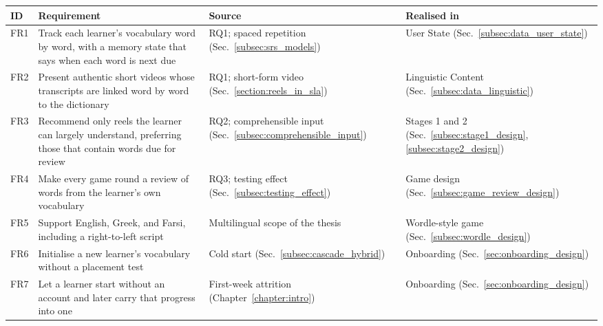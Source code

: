     \begin{center}
        \begin{minipage}{\linewidth}%
        \small
        \label{tab:functional_requirements}
        \begin{tabular}{L{0.9cm}L{5.2cm}L{3.5cm}L{3.5cm}}
            \hline
            \textbf{ID} & \textbf{Requirement} & \textbf{Source} & \textbf{Realised in} \\
            \hline
            FR1 & Track each learner's vocabulary word by word, with a memory state that says when each word is next due & RQ1; spaced repetition (Sec.~\ref{subsec:srs_models}) & User State (Sec.~\ref{subsec:data_user_state}) \\
            \hline
            FR2 & Present authentic short videos whose transcripts are linked word by word to the dictionary & RQ1; short-form video (Sec.~\ref{section:reels_in_sla}) & Linguistic Content (Sec.~\ref{subsec:data_linguistic}) \\
            \hline
            FR3 & Recommend only reels the learner can largely understand, preferring those that contain words due for review & RQ2; comprehensible input (Sec.~\ref{subsec:comprehensible_input}) & Stages 1 and 2 (Sec.~\ref{subsec:stage1_design}, \ref{subsec:stage2_design}) \\
            \hline
            FR4 & Make every game round a review of words from the learner's own vocabulary & RQ3; testing effect (Sec.~\ref{subsec:testing_effect}) & Game design (Sec.~\ref{subsec:game_review_design}) \\
            \hline
            FR5 & Support English, Greek, and Farsi, including a right-to-left script & Multilingual scope of the thesis & Wordle-style game (Sec.~\ref{subsec:wordle_design}) \\
            \hline
            FR6 & Initialise a new learner's vocabulary without a placement test & Cold start (Sec.~\ref{subsec:cascade_hybrid}) & Onboarding (Sec.~\ref{sec:onboarding_design}) \\
            \hline
            FR7 & Let a learner start without an account and later carry that progress into one & First-week attrition (Chapter~\ref{chapter:intro}) & Onboarding (Sec.~\ref{sec:onboarding_design}) \\
            \hline
        \end{tabular}
        \end{minipage}
    \end{center}

